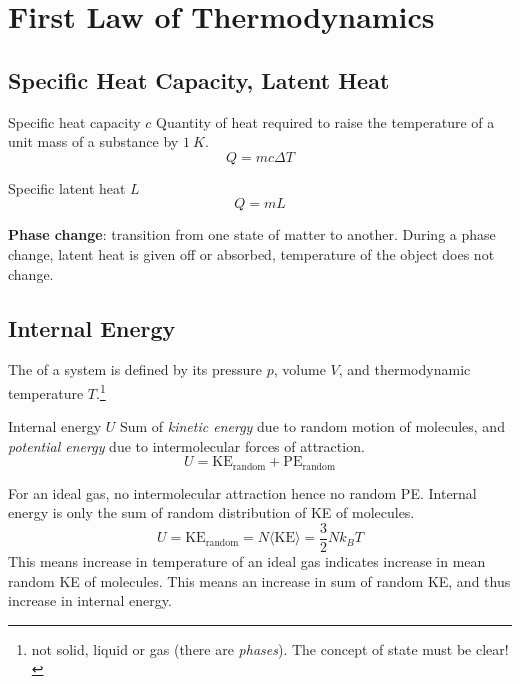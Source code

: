 \section{First Law of Thermodynamics}
\subsection{Specific Heat Capacity, Latent Heat}
\begin{defn}{Specific heat capacity $c$}{}
Quantity of heat required to raise the temperature of a unit mass of a substance by $1\:\unit{K}$.
\begin{equation}
Q = mc\Delta T
\end{equation}
\end{defn}

\begin{defn}{Specific latent heat $L$}{}
\begin{equation}
Q = mL
\end{equation}
\end{defn}

\textbf{Phase change}: transition from one state of matter to another. During a phase change, latent heat is given off or absorbed, temperature of the object does not change.

\subsection{Internal Energy}
The  of a system is defined by its pressure $p$, volume $V$, and thermodynamic temperature $T$.\footnote{not solid, liquid or gas (there are \emph{phases}). The concept of state must be clear!}

\begin{defn}{Internal energy $U$}{}
Sum of \emph{kinetic energy} due to random motion of molecules, and \emph{potential energy} due to intermolecular forces of attraction.
\begin{equation}
U = \text{KE}_\text{random} + \text{PE}_\text{random}
\end{equation}
\end{defn}

For an ideal gas, no intermolecular attraction hence no random PE. Internal energy is only the sum of random distribution of KE of molecules.
\[ U = \text{KE}_\text{random} = N\langle\text{KE}\rangle = \frac{3}{2}Nk_BT \]
This means increase in temperature of an ideal gas indicates increase in mean random KE of molecules. This means an increase in sum of random KE, and thus increase in internal energy.

